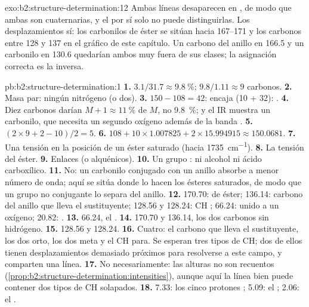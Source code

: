 \begin{solution}{exo:b2:structure-determination:12}
Ambas líneas desaparecen en , de modo que ambas son cuaternarias, y el  por sí solo no puede distinguirlas. Los desplazamientos
sí: los carbonilos de éster se sitúan hacia 167--171 y los carbonos  entre 128 y 137 en el gráfico de este
capítulo. Un carbono del anillo en 166.5 y un carbonilo en 130.6 quedarían ambos muy fuera de sus clases; la
asignación correcta es la inversa.
\end{solution}

\begin{solution}{pb:b2:structure-determination:1}
\textbf{1.} $3.1/31.7 \approx 9.8~\%$; $9.8/1.11 \approx 9$ carbonos.
\textbf{2.} Masa par: ningún nitrógeno (o dos).
\textbf{3.} $150 - 108 = 42$:  encaja (10 + 32): .
\textbf{4.} Diez carbonos darían $M+1 \approx 11~\%$ de $M$, no 9.8~\%; y el IR muestra un
carbonilo, que necesita un segundo oxígeno además de la banda .
\textbf{5.} $(2 \times 9 + 2 - 10)/2 = 5$.
\textbf{6.} $108 + 10 \times 1.007825 + 2 \times 15.994915 \approx 150.0681$.
\textbf{7.} Una tensión  en la posición de un éster saturado (hacia \qty{1735}{cm^{-1}}).
\textbf{8.} La tensión  del éster.
\textbf{9.} Enlaces   (o alquénicos).
\textbf{10.} Un grupo : ni alcohol ni ácido carboxílico.
\textbf{11.} No: un carbonilo conjugado con un anillo absorbe a menor número de onda; aquí se sitúa donde lo hacen
los ésteres saturados, de modo que un grupo no conjugante lo separa del anillo.
\textbf{12.} 170.70:  de éster; 136.14: carbono del anillo que lleva el sustituyente; 128.56 y 128.24:
CH ; 66.24:  unido a un oxígeno; 20.82: .
\textbf{13.} 66.24, el .
\textbf{14.} 170.70 y 136.14, los dos carbonos sin hidrógeno.
\textbf{15.} 128.56 y 128.24.
\textbf{16.} Cuatro: el carbono que lleva el sustituyente, los dos orto, los dos meta y el CH para. Se esperan tres
tipos de CH; dos de ellos tienen desplazamientos demasiado próximos para resolverse a este campo, y comparten una línea.
\textbf{17.} No necesariamente: las alturas no son recuentos (\cref{prop:b2:structure-determination:intensities}),
aunque aquí la línea bien puede contener dos tipos de CH solapados.
\textbf{18.} 7.33: los cinco protones ; 5.09: el ; 2.06: el .

\end{solution}
